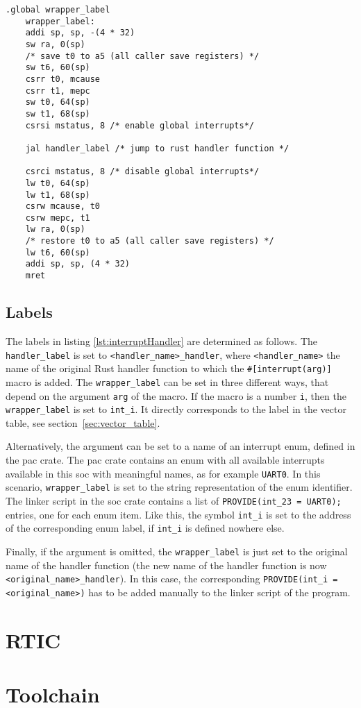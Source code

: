 \begin{lstlisting}[language={[RISC-V]Assembler}, caption={Interrupt Handler Wrapper}, label={lst:interruptHandler}]
    .global wrapper_label
    wrapper_label:
    addi sp, sp, -(4 * 32)
    sw ra, 0(sp)
    /* save t0 to a5 (all caller save registers) */
    sw t6, 60(sp)
    csrr t0, mcause
    csrr t1, mepc
    sw t0, 64(sp)
    sw t1, 68(sp)
    csrsi mstatus, 8 /* enable global interrupts*/
    
    jal handler_label /* jump to rust handler function */
    
    csrci mstatus, 8 /* disable global interrupts*/
    lw t0, 64(sp)
    lw t1, 68(sp)
    csrw mcause, t0
    csrw mepc, t1
    lw ra, 0(sp)
    /* restore t0 to a5 (all caller save registers) */
    lw t6, 60(sp)
    addi sp, sp, (4 * 32)
    mret
\end{lstlisting}

\subsection{Labels}
\label{sec:interrupt_macro_labels}
The labels in listing \ref{lst:interruptHandler} are determined as follows. The \texttt{handler_label} is set to \texttt{<handler_name>_handler}, where \texttt{<handler_name>} the name of the original Rust handler function to which the \texttt{\#[interrupt(arg)]} macro is added. The \texttt{wrapper_label} can be set in three different ways, that depend on the argument \texttt{arg} of the macro. If the macro is a number \texttt{i}, then the \texttt{wrapper_label} is set to \texttt{int_i}. It directly corresponds to the label in the vector table, see section~\ref{sec:vector_table}.

Alternatively, the argument can be set to a name of an interrupt enum, defined in the \gls{pac} crate. 
The \gls{pac} crate contains an enum with all available interrupts available in this \gls{soc} with meaningful names, as for example \texttt{UART0}. In this scenario, \texttt{wrapper_label} is set to the string representation of the enum identifier.
The linker script in the \gls{soc} crate contains a list of \texttt{PROVIDE(int_23 = UART0);} entries, one for each enum item. Like this, the symbol \texttt{int_i} is set to the address of the corresponding enum label, if \texttt{int_i} is defined nowhere else.

Finally, if the argument is omitted, the \texttt{wrapper_label} is just set to the original name of the handler function (the new name of the handler function is now \texttt{<original_name>_handler}). In this case, the corresponding \texttt{PROVIDE(int_i = <original_name>)} has to be added manually to the linker script of the program.

\section{RTIC}

\section{Toolchain}

\section{}